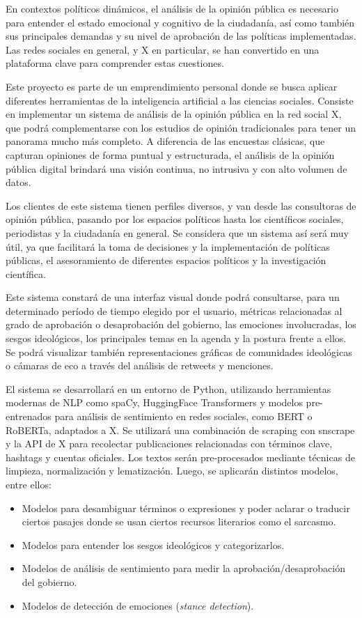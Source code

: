 \documentclass[
11pt, %
]{charter}
\begin{document}
En contextos políticos dinámicos, el análisis de la opinión pública es necesario para entender el estado emocional y cognitivo de la ciudadanía, así como también sus principales demandas y su nivel de aprobación de las políticas implementadas. Las redes sociales en general, y X en particular, se han convertido en una plataforma clave para comprender estas cuestiones.

Este proyecto es parte de un emprendimiento personal donde se busca aplicar diferentes herramientas de la inteligencia artificial a las ciencias sociales. Consiste en implementar un sistema de análisis de la opinión pública en la red social X, que podrá complementarse con los estudios de opinión tradicionales para tener un panorama mucho más completo. A diferencia de las encuestas clásicas, que capturan opiniones de forma puntual y estructurada, el análisis de la opinión pública digital brindará una visión continua, no intrusiva y con alto volumen de datos.

Los clientes de este sistema tienen perfiles diversos, y van desde las consultoras de opinión pública, pasando por los espacios políticos hasta los científicos sociales, periodistas y la ciudadanía en general. Se considera que un sistema así será muy útil, ya que facilitará la toma de decisiones y la implementación de políticas públicas, el asesoramiento de diferentes espacios políticos y la investigación científica.

Este sistema constará de una interfaz visual donde podrá consultarse, para un determinado período de tiempo elegido por el usuario, métricas relacionadas al grado de aprobación o desaprobación del gobierno, las emociones involucradas, los sesgos ideológicos, los principales temas en la agenda y la postura frente a ellos. Se podrá visualizar también representaciones gráficas de comunidades ideológicas o cámaras de eco a través del análisis de retweets y menciones.

El sistema se desarrollará en un entorno de Python, utilizando herramientas modernas de NLP como spaCy, HuggingFace Transformers y modelos pre-entrenados para análisis de sentimiento en redes sociales, como BERT o RoBERTa, adaptados a X. Se utilizará una combinación de scraping con snscrape y la API de X para recolectar publicaciones relacionadas con términos clave, hashtags y cuentas oficiales. Los textos serán pre-procesados mediante técnicas de limpieza, normalización y lematización. Luego, se aplicarán distintos modelos, entre ellos:
\begin{itemize}
	\item Modelos para desambiguar términos o expresiones y poder aclarar o traducir ciertos pasajes donde se usan ciertos recursos literarios como el sarcasmo.
	\item Modelos para entender los sesgos ideológicos y categorizarlos.
	\item Modelos de análisis de sentimiento para medir la aprobación/desaprobación del gobierno.
	\item Modelos de detección de emociones (\textit{stance detection}).	
\end{itemize}
\end{document}
